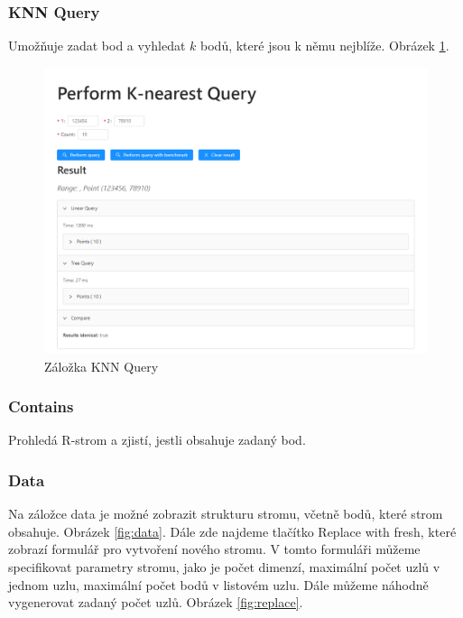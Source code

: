 \documentclass[a4paper,10pt]{article}
\begin{document}
\subsubsection*{KNN Query}
Umožňuje zadat bod a vyhledat $k$ bodů, které jsou k němu nejblíže. Obrázek \ref{fig:knnq}.
\begin{figure}
    \includegraphics[width=\textwidth]{KNNQuery.png}
    \caption{Záložka KNN Query}
    \label{fig:knnq}
\end{figure}
\subsubsection*{Contains}
Prohledá R-strom a zjistí, jestli obsahuje zadaný bod.

\subsubsection*{Data}
Na záložce data je možné zobrazit strukturu stromu, včetně bodů, které strom obsahuje. Obrázek \ref{fig:data}. Dále zde najdeme tlačítko Replace with fresh, které zobrazí formulář pro vytvoření nového stromu. V tomto formuláři můžeme specifikovat parametry stromu, jako je počet dimenzí, maximální počet uzlů v jednom uzlu, maximální počet bodů v listovém uzlu. Dále můžeme náhodně vygenerovat zadaný počet uzlů. Obrázek \ref{fig:replace}.
\end{document}
